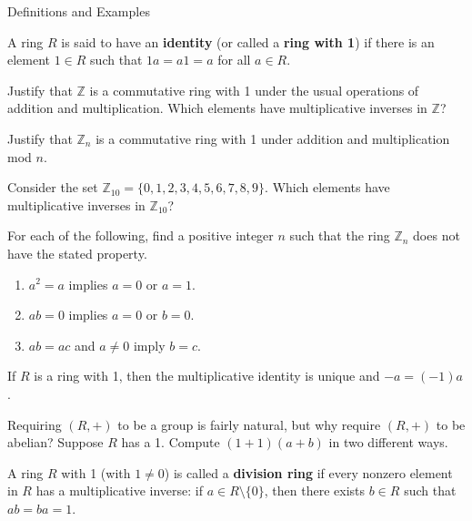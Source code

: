 \begin{section}{Definitions and Examples}
\begin{definition}
A ring $R$ is said to have an \textbf{identity} (or called a \textbf{ring with  1}) if there is an element $1\in R$ such that $1a=a 1=a$ for all $a\in R$.
\end{definition}

\begin{problem}
Justify that $\mathbb{Z}$ is a commutative ring with 1 under the usual operations of addition and multiplication. Which elements have multiplicative inverses in $\mathbb{Z}$?
\end{problem}

\begin{problem}
Justify that $\mathbb{Z}_n$ is a commutative ring with 1 under addition and multiplication mod $n$.
\end{problem}

\begin{problem}\label{prob:Z10Ring}
Consider the set $\mathbb{Z}_{10}=\{0,1,2,3,4,5,6,7,8,9\}$. Which elements have multiplicative inverses in $\mathbb{Z}_{10}$?
\end{problem}

\begin{problem}
For each of the following, find a positive integer $n$ such that the ring $\mathbb{Z}_n$ does not have the stated property.
\begin{enumerate}[label=\rm{(\alph*)}]
\item $a^2=a$ implies $a=0$ or $a=1$.
\item $ab=0$ implies $a=0$ or $b=0$.
\item $ab=ac$ and $a\neq 0$ imply $b=c$.
\end{enumerate}
\end{problem}

\begin{theorem}
If $R$ is a ring with 1, then the multiplicative identity is unique and $-a=(-1)a$.
\end{theorem}

\begin{problem}
Requiring $(R,+)$ to be a group is fairly natural, but why require $(R,+)$ to be abelian?  Suppose $R$ has a 1.  Compute $(1+1)(a+b)$ in two different ways.
\end{problem}

\begin{definition}
A ring $R$ with 1 (with $1\neq 0$) is called a \textbf{division ring} if every nonzero element in $R$ has a multiplicative inverse: if $a\in R\setminus\{0\}$, then there exists $b\in R$ such that $ab=ba=1$.
\end{definition}


\end{section}
